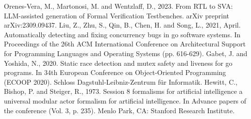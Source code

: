 \begin{thebibliography}{9}
Orenes-Vera, M., Martonosi, M. and Wentzlaff, D., 2023. From RTL to SVA: LLM-assisted generation of Formal Verification Testbenches. arXiv preprint arXiv:2309.09437.
Liu, Z., Zhu, S., Qin, B., Chen, H. and Song, L., 2021, April. Automatically detecting and fixing concurrency bugs in go software systems. In Proceedings of the 26th ACM International Conference on Architectural Support for Programming Languages and Operating Systems (pp. 616-629).
Gabet, J. and Yoshida, N., 2020. Static race detection and mutex safety and liveness for go programs. In 34th European Conference on Object-Oriented Programming (ECOOP 2020). Schloss Dagstuhl-Leibniz-Zentrum für Informatik.
Hewitt, C., Bishop, P. and Steiger, R., 1973. Session 8 formalisms for artificial intelligence a universal modular actor formalism for artificial intelligence. In Advance papers of the conference (Vol. 3, p. 235). Menlo Park, CA: Stanford Research Institute.
\end{thebibliography}